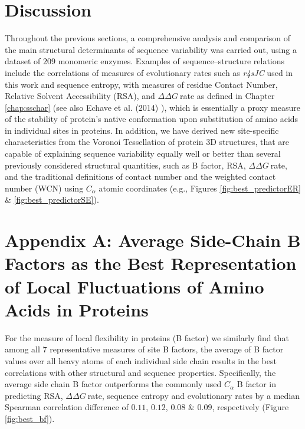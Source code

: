 \documentclass[11pt]{article}
\newcommand{\ddg}{$\Delta\Delta G~$}
\begin{document}
\section{Discussion}
\label{sec:discussion}

    Throughout the previous sections,  a comprehensive analysis and comparison of the main structural determinants of sequence variability was carried out, using a dataset of $209$ monomeric enzymes. Examples of sequence--structure relations include the correlations of measures of evolutionary rates such as {\it r4sJC} used in this work and sequence entropy, with measures of residue Contact Number, Relative Solvent Accessibility (RSA), and \ddg rate as defined in Chapter \ref{chap:sschar} (see also Echave et al. (2014) \cite{echave_relationship_2014}), which is essentially a proxy measure of the stability of protein's native conformation upon substitution of amino acids in individual sites in proteins. In addition, we have derived new site-specific characteristics from the Voronoi Tessellation of protein 3D structures, that are capable of explaining sequence variability equally well or better than several previously considered structural quantities, such as B factor, RSA, \ddg rate, and the traditional definitions of contact number and the weighted contact number (WCN) using $C_\alpha$ atomic coordinates (e.g., Figures \ref{fig:best_predictorER} \& \ref{fig:best_predictorSE}).

\appendix

\section*{Appendix A: Average Side-Chain B Factors as the Best Representation of Local Fluctuations of Amino Acids in Proteins}
\label{app:best_crd}

    For the measure of local flexibility in proteins (B factor) we similarly find that among all $7$ representative measures of site B factors, the average of B factor values over all heavy atoms of each individual side chain results in the best correlations with other structural and sequence properties. Specifically, the average side chain B factor outperforms the commonly used $C_\alpha$ B factor in predicting RSA, \ddg rate, sequence entropy and evolutionary rates by a median Spearman correlation difference of $0.11$, $0.12$, $0.08$ \& $0.09$, respectively (Figure \ref{fig:best_bf}). \\

\end{document}
